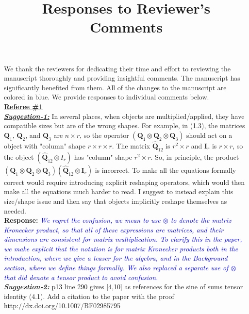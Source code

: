 \documentclass{article}
\title{Responses to Reviewer's Comments}
\date{}
\newcommand{\mat}[1]{\mathbf{#1}}
\newcommand{\response}[1]{\textbf{Response:} \textcolor{blue}{\textit{#1}}\\}
\begin{document}
\maketitle

We thank the reviewers for dedicating their time and effort to reviewing the manuscript thoroughly and providing insightful comments. The manuscript has significantly benefited from them. All of the changes to the manuscript are colored in blue.  We provide responses to individual comments below.\\


\noindent \underline{\textbf{Referee \#1}}\\


\noindent \ul{\textit{\textbf{Suggestion-1:}}}  In several places, when objects are multiplied/applied, they have compatible sizes but are of the wrong shapes.
For example, in (1.3), the matrices $\mat{Q}_1$, $\mat{Q}_2$, and $\mat{Q}_3$ are $n \times r$, so the operator $(\mat{Q}_1 \otimes \mat{Q}_2 \otimes \mat{Q}_3)$ should act on a object with "column" shape $r \times r \times r$.
The matrix $\hat{\mat{Q}}_{12}$ is $r^2 \times r$ and $\mat{I}_r$ is $r \times r$, so the object $(\hat{\mat{Q}}_{12} \otimes I_r)$ has "column" shape $r^2 \times r$.
So, in principle, the product $(\mat{Q}_1 \otimes \mat{Q}_2 \otimes \mat{Q}_3)(\hat{\mat{Q}}_{12} \otimes \mat{I}_r)$ is incorrect.
To make all the equations formally correct would require introducing explicit reshaping operators, which would then make all the equations much harder to read.
I suggest to instead explain this size/shape issue and then say that objects implicitly reshape themselves as needed.\\

\response{We regret the confusion, we mean to use $\otimes$ to denote the matrix Kronecker product, so that all of these expressions are matrices, and their dimensions are consistent for matrix multiplication.  To clarify this in the paper, we make explicit that the notation is for matrix Kronecker products both in the introduction, where we give a teaser for the algebra, and in the Background section, where we define things formally.  We also replaced a separate use of $\otimes$ that did denote a tensor product to avoid confusion.}

\noindent \ul{\textit{\textbf{Suggestion-2:}}} p13 line 290 gives [4,10] as references for the sine of sums tensor identity (4.1). Add a citation to the paper with the proof http://dx.doi.org/10.1007/BF02985795\\
\end{document}
